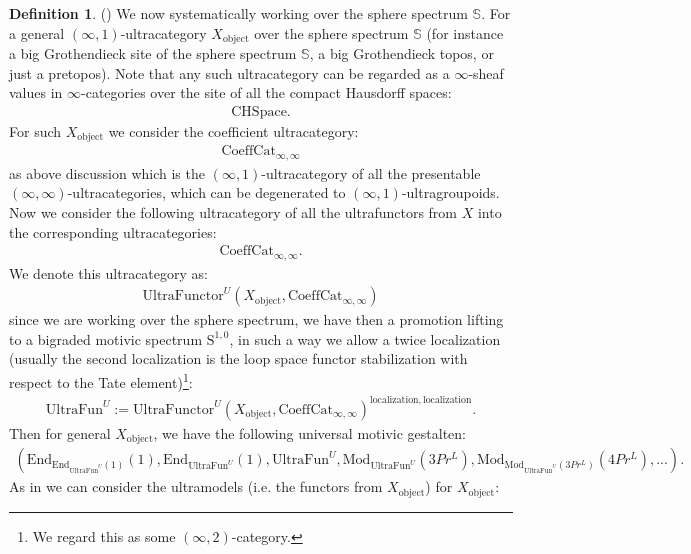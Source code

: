 \documentclass[12pt]{article}
\theoremstyle{definition}
\newtheorem{definition}{Definition}
\begin{document}
\begin{definition}()
We now systematically working over the sphere spectrum $\mathbb{S}$. For a general $(\infty,1)$-ultracategory $X_\mathrm{object}$ over the sphere spectrum $\mathbb{S}$ (for instance a big Grothendieck site of the sphere spectrum $\mathbb{S}$, a big Grothendieck topos, or just a pretopos). Note that any such ultracategory can be regarded as a $\infty$-sheaf values in $\infty$-categories over the site of all the compact Hausdorff spaces:
\begin{align}
\mathrm{CHSpace}.
\end{align}
For such $X_\mathrm{object}$ we consider the coefficient ultracategory:
\begin{align}
\mathrm{CoeffCat}_{\infty,\infty}
\end{align}
as above discussion which is the $(\infty,1)$-ultracategory of all the presentable $(\infty,\infty)$-ultracategories, which can be degenerated to $(\infty,1)$-ultragroupoids. Now we consider the following ultracategory of all the ultrafunctors from $X$ into the corresponding ultracategories:
\begin{align}
\mathrm{CoeffCat}_{\infty,\infty}.
\end{align}
We denote this ultracategory as:
\begin{align}
\mathrm{UltraFunctor}^U(X_\mathrm{object},\mathrm{CoeffCat}_{\infty,\infty})
\end{align}
since we are working over the sphere spectrum, we have then a promotion lifting to a bigraded motivic spectrum $\mathrm{S}^{1,0}$, in such a way we allow a twice localization (usually the second localization is the loop space functor stabilization with respect to the Tate element)\footnote{We regard this as some $(\infty,2)$-category.}:
\begin{align}
\mathrm{UltraFun}^U:=\mathrm{UltraFunctor}^U(X_\mathrm{object},\mathrm{CoeffCat}_{\infty,\infty})^{\mathrm{localization}, \mathrm{localization}}.
\end{align}
Then for general $X_\mathrm{object}$, we have the following universal motivic gestalten:
\begin{align}
(\mathrm{End}_{\mathrm{End}_{\mathrm{UltraFun}^U}(1)}(1),\mathrm{End}_{\mathrm{UltraFun}^U}(1),\mathrm{UltraFun}^U,\mathrm{Mod}_{\mathrm{UltraFun}^U}(3Pr^L),\mathrm{Mod}_{\mathrm{Mod}_{\mathrm{UltraFun}^U}(3Pr^L)}(4Pr^L),...).
\end{align}
As in \cite{5Lu3} we can consider the ultramodels (i.e. the functors from $X_\mathrm{object}$) for $X_\mathrm{object}$:

\end{definition}
\end{document}
